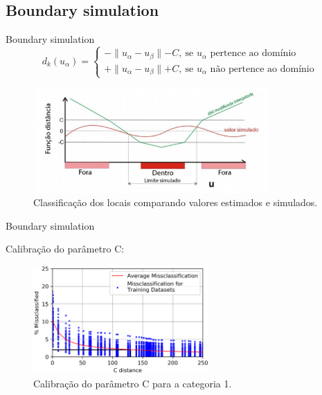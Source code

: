 \documentclass[aspectratio=169]{beamer}
\begin{document}
\subsection{Boundary simulation}

\begin{frame}{Boundary simulation}
	\begin{equation}
	d_k(u_\alpha)=\begin{cases}
	-\parallel u_\alpha-u_\beta\parallel - C,\:\textrm{se $u_\alpha$ pertence ao domínio}\\
	+\parallel u_\alpha-u_\beta\parallel + C,\:\textrm{se $u_\alpha$ não pertence ao domínio}\end{cases}
	\label{C_dist}
	\end{equation}
	
	\begin{figure}[H]
		\caption{\label{class}Classificação dos locais comparando valores estimados e simulados.}
		\begin{center}
			\includegraphics[width=0.8\textwidth]{capitulo_2/classificacao.png}
		\end{center}
	\end{figure}
\end{frame}

\begin{frame}{Boundary simulation}

Calibração do parâmetro C:

	\begin{figure}[H]
		\caption{\label{c_param_1}Calibração do parâmetro C para a categoria 1.}
		\begin{center}
			\includegraphics[width=0.6\textwidth]{capitulo_2/uncert_1.png}
		\end{center}
	\end{figure}
\end{frame}
\end{document}
